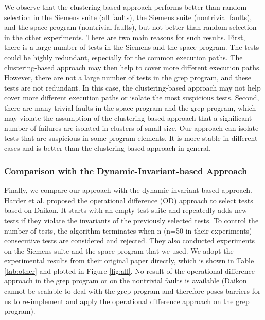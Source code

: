 \documentclass{sig-alternate}
\begin{document}
We observe that the clustering-based approach performs better than
random selection in the Siemens suite (all faults), the Siemens
suite (nontrivial faults), and the space program (nontrivial
faults), but not better than random selection in the other
experiments. There are two main reasons for such results. First,
there is a large number of tests in the Siemens and the space
program. The tests could be highly redundant, especially for the
common execution paths. The clustering-based approach may then help
to cover more different execution paths. However, there are not a
large number of tests in the grep program, and these tests are not
redundant. In this case, the clustering-based approach may not help
cover more different execution paths or isolate the most suspicious
tests. Second, there are many trivial faults in the space program
and the grep program, which may violate the assumption of the
clustering-based approach that a significant number of failures are
isolated in clusters of small size. Our approach can isolate tests
that are suspicious in some program elements. It is more stable in
different cases and is better than the clustering-based approach in
general.



\subsubsection{Comparison with the Dynamic-Invariant-based Approach}

Finally, we compare our approach with the dynamic-invariant-based
approach. Harder et al. \cite{Harder03} proposed the operational
difference (OD) approach to select tests based on Daikon. It starts
with an empty test suite and repeatedly adds new tests if they
violate the invariants of the previously selected tests. To control
the number of tests, the algorithm terminates when n (n=50 in their
experiments) consecutive tests are considered and rejected. They
also conducted experiments on the Siemens suite and the space
program that we used. We adopt the experimental results from their
original paper directly, which is shown in Table \ref{tab:other} and
plotted in Figure \ref{fig:all}. No result of the operational
difference approach in the grep program or on the nontrivial faults
is available (Daikon cannot be scalable to deal with the grep
program and therefore poses barriers for us to re-implement and
apply the operational difference approach on the grep program).
\end{document}

